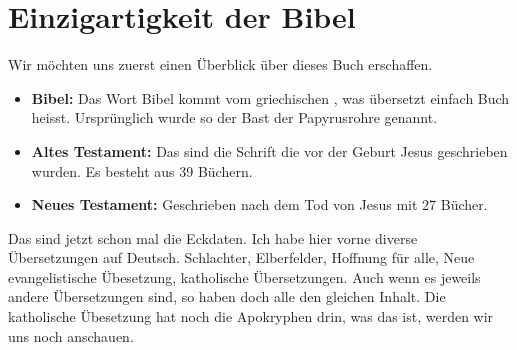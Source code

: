 \section{Einzigartigkeit der Bibel}
Wir möchten uns zuerst einen Überblick über dieses Buch erschaffen.
\begin{itemize}
    \item\textbf{Bibel:} Das Wort Bibel kommt vom griechischen , was übersetzt einfach Buch heisst. Ursprünglich wurde so der Bast der Papyrusrohre genannt.
    \item\textbf{Altes Testament:} Das sind die Schrift die vor der Geburt Jesus geschrieben wurden. Es besteht aus 39 Büchern.
    \item \textbf{Neues Testament:} Geschrieben nach dem Tod von Jesus mit 27 Bücher. 
\end{itemize}
Das sind jetzt schon mal die Eckdaten. Ich habe hier vorne diverse Übersetzungen auf Deutsch. Schlachter, Elberfelder, Hoffnung für alle, Neue evangelistische Übesetzung, katholische Übersetzungen. Auch wenn es jeweils andere Übersetzungen sind, so haben doch alle den gleichen Inhalt. Die katholische Übesetzung hat noch die Apokryphen drin, was das ist, werden wir uns noch anschauen.

